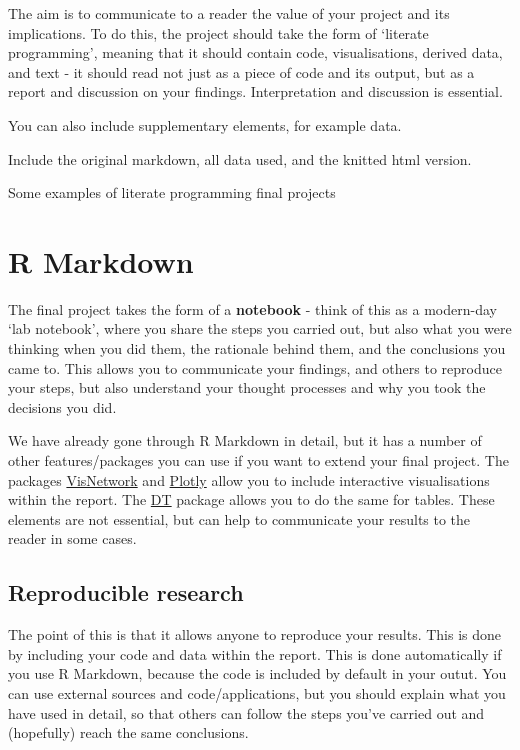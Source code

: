 \documentclass[
]{book}
\begin{document}
The aim is to communicate to a reader the value of your project and its implications. To do this, the project should take the form of `literate programming', meaning that it should contain code, visualisations, derived data, and text - it should read not just as a piece of code and its output, but as a report and discussion on your findings. Interpretation and discussion is essential.

You can also include supplementary elements, for example data.

Include the original markdown, all data used, and the knitted html version.

Some examples of literate programming final projects

\hypertarget{r-markdown}{%
\section{R Markdown}\label{r-markdown}}

The final project takes the form of a \textbf{notebook} - think of this as a modern-day `lab notebook', where you share the steps you carried out, but also what you were thinking when you did them, the rationale behind them, and the conclusions you came to. This allows you to communicate your findings, and others to reproduce your steps, but also understand your thought processes and why you took the decisions you did.

We have already gone through R Markdown in detail, but it has a number of other features/packages you can use if you want to extend your final project. The packages \href{https://datastorm-open.github.io/visNetwork/}{VisNetwork} and \href{https://plotly.com/r/}{Plotly} allow you to include interactive visualisations within the report. The \href{https://rstudio.github.io/DT/}{DT} package allows you to do the same for tables. These elements are not essential, but can help to communicate your results to the reader in some cases.

\hypertarget{reproducible-research}{%
\subsection{Reproducible research}\label{reproducible-research}}

The point of this is that it allows anyone to reproduce your results. This is done by including your code and data within the report. This is done automatically if you use R Markdown, because the code is included by default in your outut. You can use external sources and code/applications, but you should explain what you have used in detail, so that others can follow the steps you've carried out and (hopefully) reach the same conclusions.
\end{document}
